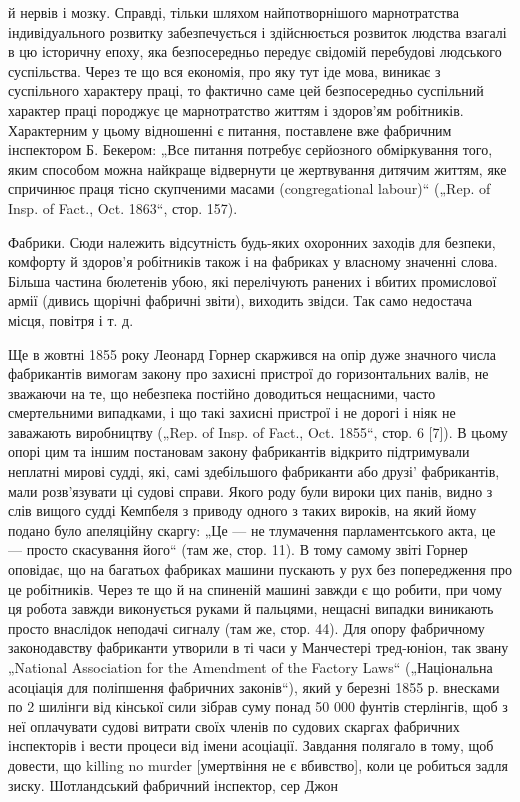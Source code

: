 \parcont{}  %
й нервів і мозку. Справді, тільки шляхом найпотворнішого марнотратства індивідуального розвитку
забезпечується і здійснюється
розвиток людства взагалі в цю історичну епоху, яка безпосередньо передує свідомій перебудові
людського суспільства. Через те що вся економія, про яку тут іде мова, виникає з суспільного
характеру праці, то фактично саме цей безпосередньо
суспільний характер праці породжує це марнотратство життям і
здоров’ям робітників. Характерним у цьому відношенні є питання,
поставлене вже фабричним інспектором Б. Бекером: „Все питання потребує серйозного обміркування того,
яким способом
можна найкраще відвернути це жертвування дитячим життям,
яке спричинює праця тісно скупченими масами (congregational
labour)“ („Rep. of Insp. of Fact., Oct. 1863“, стор. 157).

Фабрики. Сюди належить відсутність будь-яких охоронних
заходів для безпеки, комфорту й здоров’я робітників також і на
фабриках у власному значенні слова. Більша частина бюлетенів
убою, які перелічують ранених і вбитих промислової армії (дивись щорічні фабричні звіти), виходить
звідси. Так само недостача місця, повітря і т. д.

Ще в жовтні 1855 року Леонард Горнер скаржився на опір
дуже значного числа фабрикантів вимогам закону про захисні
пристрої до горизонтальних валів, не зважаючи на те, що небезпека постійно доводиться нещасними,
часто смертельними
випадками, і що такі захисні пристрої і не дорогі і ніяк не заважають виробництву („Rep. of Insp. of
Fact., Oct. 1855“, стор. 6 [7]).
В цьому опорі цим та іншим постановам закону фабрикантів
відкрито підтримували неплатні мирові судді, які, самі здебільшого фабриканти або друзі'
фабрикантів, мали розв’язувати ці судові справи. Якого роду були вироки цих панів,
видно з слів вищого судді Кемпбеля з приводу одного з таких
вироків, на який йому подано було апеляційну скаргу: „Це —
не тлумачення парламентського акта, це — просто скасування
його“ (там же, стор. 11). В тому самому звіті Горнер оповідає, що на багатьох фабриках машини
пускають у рух без
попередження про це робітників. Через те що й на спиненій
машині завжди є що робити, при чому ця робота завжди виконується руками й пальцями, нещасні випадки
виникають просто
внаслідок неподачі сигналу (там же, стор. 44). Для опору
фабричному законодавству фабриканти утворили в ті часи
у Манчестері тред-юніон, так звану „National Association for the
Amendment of the Factory Laws“ („Національна асоціація для поліпшення фабричних законів“), який у
березні 1855 р. внесками
по 2 шилінги від кінської сили зібрав суму понад 50 000 фунтів
стерлінгів, щоб з неї оплачувати судові витрати своїх членів
по судових скаргах фабричних інспекторів і вести процеси від
імени асоціації. Завдання полягало в тому, щоб довести, що killing no murder [умертвіння не є
вбивство], коли це робиться
задля зиску. Шотландський фабричний інспектор, сер Джон
\parbreak{}  %
